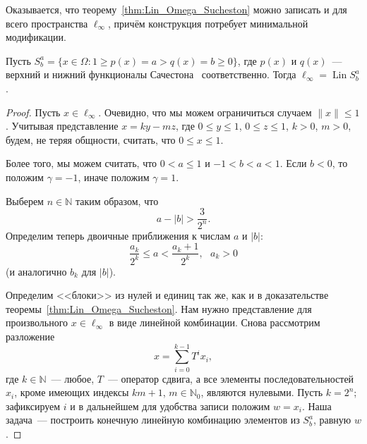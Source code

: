Оказывается, что теорему~\ref{thm:Lin_Omega_Sucheston} можно записать и для всего пространства $\ell_\infty$,
причём конструкция потребует минимальной модификации.

\begin{theorem}
	Пусть $S^a_b = \{x\in\Omega : 1 \geq p(x) = a > q(x) = b \geq 0\}$,
	где $p(x)$ и $q(x)$~--- верхний и нижний функционалы Сачестона~\cite{sucheston1967banach} соответственно.
	Тогда $\ell_\infty = \operatorname{Lin} S^a_b$.
\end{theorem}

\begin{proof}
	Пусть $x\in\ell_\infty$.
	Очевидно, что мы можем ограничиться случаем $\|x\| \leq 1$.
	Учитывая представление $x = ky - mz$,
	где $0\leq y \leq 1$, $0\leq z \leq 1$, $k>0$, $m>0$,
	будем, не теряя общности, считать, что $0\leq x \leq 1$.

	Более того, мы можем считать, что $0 < a \leq 1$ и $-1 < b < a < 1$.
	Если $b < 0$, то положим $\gamma = -1$, иначе положим $\gamma = 1$.


	Выберем $n\in\mathbb{N}$ таким образом, что
	\begin{equation}
		\label{eq:S_a_b_gap}
		a - |b| > \frac{3}{2^n}
		.
	\end{equation}
	Определим теперь двоичные приближения к числам $a$ и $|b|$:
	\begin{equation}
		\label{eq:binary_approximations_for_number}
		\frac{a_k}{2^k} \leq a < \frac{a_k+1}{2^k}
		,
		~~~a_k>0
	\end{equation}
	(и аналогично $b_k$ для $|b|$).

	Определим <<блоки>> из нулей и единиц так же, как и в доказательстве теоремы~\ref{thm:Lin_Omega_Sucheston}.
	Нам нужно представление для произвольного $x\in\ell_\infty$ в виде линейной комбинации.
	Снова рассмотрим разложение
	\begin{equation}
		x = \sum_{i=0}^{k-1} T^i x_i
		,
	\end{equation}
	где $k\in\mathbb{N}$~--- любое, $T$~--- оператор сдвига, а все элементы последовательностей $x_i$,
	кроме имеющих индексы $km+1$, $m\in\mathbb{N}_0$, являются нулевыми.
	Пусть $k=2^n$; зафиксируем $i$ и в дальнейшем для удобства записи положим $w=x_i$.
	Наша задача~--- построить конечную линейную комбинацию элементов из $S^a_b$, равную $w$.


\end{proof}
